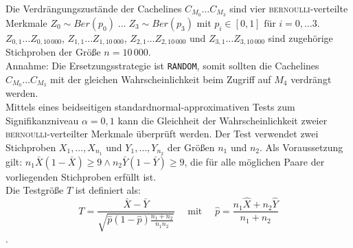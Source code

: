 \documentclass[]{scrbook}
\begin{document}
Die Verdrängungszustände der Cachelines $C_{M_0} \dots C_{M_3}$ sind vier \textsc{bernoulli}-verteilte Merkmale $Z_0 \sim Ber(p_0) \; \dots \; Z_3 \sim Ber(p_3)$ mit $p_i \in [0,1] \textrm{ für } i = 0,\dots 3$.
\\
$Z_{0,1} \dots Z_{0,10\,000}$, \quad$Z_{1,1} \dots Z_{1,10\,000}$, \quad$Z_{2,1} \dots Z_{2,10\,000}$ und $Z_{3,1} \dots Z_{3,10\,000}$ sind zugehörige Stichproben der Größe $n=10\,000$.
\\
Annahme: Die Ersetzungsstrategie ist \texttt{RANDOM}, somit sollten die Cachelines $C_{M_0} \dots C_{M_3}$ mit der gleichen Wahrscheinlichkeit beim Zugriff auf $M_4$ verdrängt werden.
\\
Mittels eines beidseitigen standardnormal-approximativen Tests zum Signifikanzniveau $\alpha = 0,1$ kann die Gleichheit der Wahrscheinlichkeit zweier \textsc{bernoulli}-verteilter Merkmale überprüft werden.
Der Test verwendet zwei Stichproben $X_1,\dots,X_{n_1}$ und $Y_1,\dots,Y_{n_2}$ der Größen $n_1$ und $n_2$.
Als Voraussetzung gilt: $n_1 \bar{X} (1-\bar{X}) \ge 9 \land n_2 \bar{Y} (1-\bar{Y}) \ge 9$, die für alle möglichen Paare der vorliegenden Stichproben erfüllt ist.
\\
Die Testgröße $T$ ist definiert als:
$$T = \frac{\bar{X} - \bar{Y}}{\sqrt{\hat{p} (1-\hat{p}) \frac{n_1+n_2}{n_1 n_2}}} \quad \textrm{ mit } \quad \hat{p} = \frac{n_1 \hat{X} + n_2 \hat{Y}}{n_1 + n_2}$$.
\end{document}
